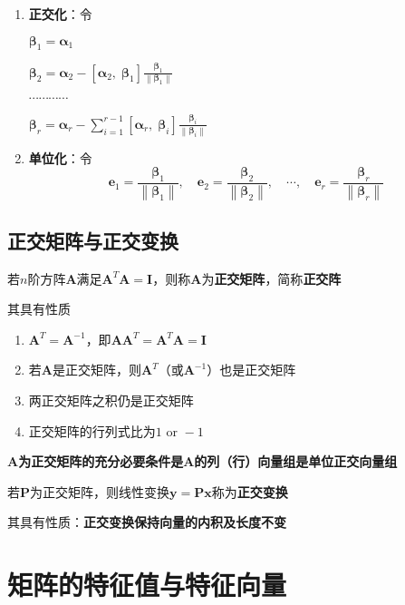 \documentclass[UTF8]{ctexart}
\newcommand{\dotprod}[2]{\left[{#1},\;{#2}\right]}
\newcommand{\ve}[1]{{\bm{#1}}}
\newcommand{\mat}[1]{\ve{#1}}
\newcommand{\norm}[1]{{\left\|#1\right\|}}
\newcommand{\emplin}{\vspace{1em}}
\begin{document}
\begin{enumerate}
  \item \textbf{正交化}：令

  $\mat{\beta}_1=\mat{\alpha}_1$

  $\displaystyle\mat{\beta}_2=\mat{\alpha}_2-\dotprod{\mat{\alpha}_2}{\mat{\beta}_1}\frac{\mat{\beta}_1}{\norm{\mat{\beta}_1}}$

  $\cdots\cdots\cdots\cdots$

  $\displaystyle\mat{\beta}_r=\mat{\alpha}_r-\sum_{i=1}^{r-1}\dotprod{\mat{\alpha}_r}{\mat{\beta}_i}\frac{\mat{\beta}_i}{\norm{\mat{\beta}_i}}$

  \item \textbf{单位化}：令
  \[
  \mat{e}_1=\frac{\mat{\beta}_1}{\norm{\mat{\beta}_1}},\quad
  \mat{e}_2=\frac{\mat{\beta}_2}{\norm{\mat{\beta}_2}},\quad
  \cdots,\quad
  \mat{e}_r=\frac{\mat{\beta}_r}{\norm{\mat{\beta}_r}}
  \]
\end{enumerate}

\subsection*{正交矩阵与正交变换}
若$n$阶方阵$\mat{A}$满足$\mat{A}^T\mat{A}=\mat{I}$，则称$\mat{A}$为\textbf{正交矩阵}，简称\textbf{正交阵}

\emplin

其具有性质
\begin{enumerate}
  \item $\mat{A}^T=\mat{A}^{-1}$，即$\mat{A}\mat{A}^T=\mat{A}^T\mat{A}=\mat{I}$
  \item 若$\mat{A}$是正交矩阵，则$\mat{A}^T$（或$\mat{A}^{-1}$）也是正交矩阵
  \item 两正交矩阵之积仍是正交矩阵
  \item 正交矩阵的行列式比为$1\text{ or }-1$
\end{enumerate}

\emplin
\emplin

\textbf{$\mat{A}$为正交矩阵的充分必要条件是$\mat{A}$的列（行）向量组是单位正交向量组}

\emplin
\emplin
\emplin

若$\mat{P}$为正交矩阵，则线性变换$\mat{y}=\mat{P}\mat{x}$称为\textbf{正交变换}

其具有性质：\textbf{正交变换保持向量的内积及长度不变}

\section*{矩阵的特征值与特征向量}
\end{document}
